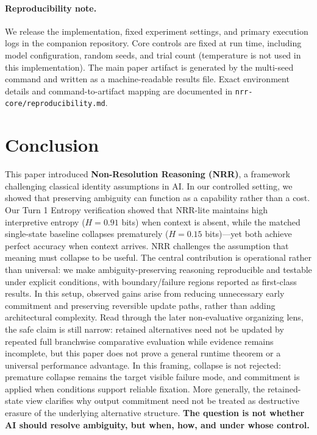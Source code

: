 \documentclass[11pt,a4paper]{article}
\begin{document}
\paragraph{Reproducibility note.}
We release the implementation, fixed experiment settings, and primary execution logs in the companion repository.
Core controls are fixed at run time, including model configuration, random seeds, and trial count (temperature is not used in this implementation).
The main paper artifact is generated by the multi-seed command and written as a machine-readable results file.
Exact environment details and command-to-artifact mapping are documented in \texttt{nrr-core/reproducibility.md}.

\section{Conclusion}

This paper introduced \textbf{Non-Resolution Reasoning (NRR)}, a framework challenging classical identity assumptions in AI.
In our controlled setting, we showed that preserving ambiguity can function as a capability rather than a cost.
Our Turn 1 Entropy verification showed that NRR-lite maintains high interpretive entropy ($H = 0.91$ bits) when context is absent, while the matched single-state baseline collapses prematurely ($H = 0.15$ bits)---yet both achieve perfect accuracy when context arrives.
NRR challenges the assumption that meaning must collapse to be useful.
The central contribution is operational rather than universal: we make ambiguity-preserving reasoning reproducible and testable under explicit conditions, with boundary/failure regions reported as first-class results.
In this setup, observed gains arise from reducing unnecessary early commitment and preserving reversible update paths, rather than adding architectural complexity. Read through the later non-evaluative organizing lens, the safe claim is still narrow: retained alternatives need not be updated by repeated full branchwise comparative evaluation while evidence remains incomplete, but this paper does not prove a general runtime theorem or a universal performance advantage.
In this framing, collapse is not rejected: premature collapse remains the target visible failure mode, and commitment is applied when conditions support reliable fixation. More generally, the retained-state view clarifies why output commitment need not be treated as destructive erasure of the underlying alternative structure.
\textbf{The question is not whether AI should resolve ambiguity, but when, how, and under whose control.}
\end{document}
